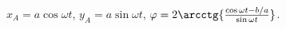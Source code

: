 $x_A = a\cos{\omega t}$, $y_A = a\sin{\omega t}$,
$\varphi = 2\arcctg{\frac{\cos{\omega t} - b/a}{\sin{\omega t}}}$. 
